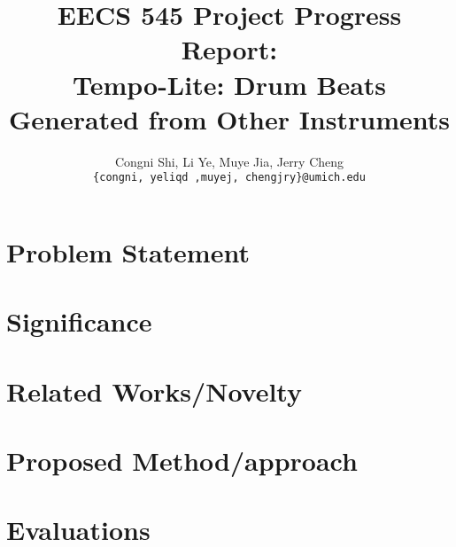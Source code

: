 \documentclass[11pt,letterpaper]{article}
\title{EECS 545 Project Progress Report: \\
        Tempo-Lite: Drum Beats Generated from Other Instruments}
\author{Congni Shi, Li Ye, Muye Jia, Jerry Cheng\\
        \texttt{\{congni, yeliqd ,muyej, chengjry\}@umich.edu}
}
\begin{document}
\maketitle

\section{Problem Statement}
    \label{sec:problem}
    
\section{Significance}
    \label{sec:significance}
    
\section{Related Works/Novelty}
    \label{sec:novelty}
    
\section{Proposed Method/approach}
    \label{sec:approach}
    

\section{Evaluations}
    \label{sec:eval}
    


\nocite{*}

\end{document}
